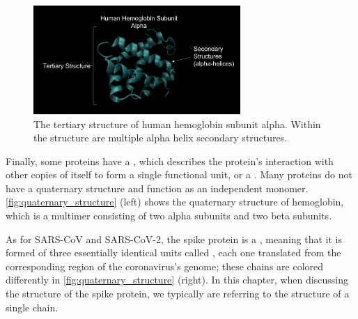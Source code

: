 \begin{figure}[h]
	\centering
	\mySfFamily
	\includegraphics[width = 0.7\textwidth]{../images/hemoglobin_tertiary_structure.png}
	\caption{The tertiary structure of human hemoglobin subunit alpha. Within the structure are multiple alpha helix secondary structures.}
	\label{fig:hemoglobin_tertiary_structure}
\end{figure}

Finally, some proteins have a , which describes the protein’s interaction with other copies of itself to form a single functional unit, or a . Many proteins do not have a quaternary structure and function as an independent monomer. \autoref{fig:quaternary_structure} (left) shows the quaternary structure of hemoglobin, which is a multimer consisting of two alpha subunits and two beta subunits.

As for SARS-CoV and SARS-CoV-2, the spike protein is a , meaning that it is formed of three essentially identical units called , each one translated from the corresponding region of the coronavirus's genome; these chains are colored differently in \autoref{fig:quaternary_structure} (right). In this chapter, when discussing the structure of the spike protein, we typically are referring to the structure of a single chain.

